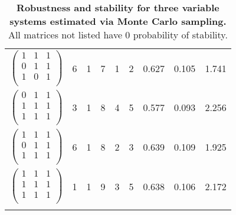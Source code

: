 \begin{longtable*}{ c | c || c | c | c | c | c | c | c }
$\begin{pmatrix}
1 & 1 & 1\\
0 & 1 & 1\\
1 & 0 & 1\\
\end{pmatrix}$ & 6 & 1 & 7 & 1 & 2 & 0.627 & 0.105 & 1.741\\
$\begin{pmatrix}
0 & 1 & 1\\
1 & 1 & 1\\
1 & 1 & 1\\
\end{pmatrix}$ & 3 & 1 & 8 & 4 & 5 & 0.577 & 0.093 & 2.256\\
$\begin{pmatrix}
1 & 1 & 1\\
0 & 1 & 1\\
1 & 1 & 1\\
\end{pmatrix}$ & 6 & 1 & 8 & 2 & 3 & 0.639 & 0.109 & 1.925\\
$\begin{pmatrix}
1 & 1 & 1\\
1 & 1 & 1\\
1 & 1 & 1\\
\end{pmatrix}$ & 1 & 1 & 9 & 3 & 5 & 0.638 & 0.106 & 2.172\\
\caption{{\bf Robustness and stability for three variable systems estimated via Monte Carlo sampling.} All matrices not listed have $0$ probability of stability.}\label{tab:structstabmat3}
\end{longtable*}
